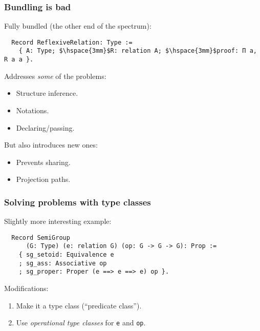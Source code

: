 \documentclass{beamer}
\begin{document}
\begin{frame}[fragile]
\frametitle{Bundling is bad}

Fully bundled (the other end of the spectrum):
\begin{lstlisting}
  Record ReflexiveRelation: Type :=
    { A: Type; $\hspace{3mm}$R: relation A; $\hspace{3mm}$proof: Π a, R a a }.
\end{lstlisting}
Addresses \emph{some} of the problems:
\begin{itemize}
\item Structure inference. %
\item Notations. %
\item Declaring/passing.
\end{itemize}

But also introduces new ones:
\begin{itemize}
\item Prevents sharing.
\item Projection paths.
\end{itemize}
\end{frame}

\begin{frame}[fragile]
\frametitle{Solving problems with type classes}

Slightly more interesting example:
\begin{lstlisting}
  Record SemiGroup
      (G: Type) (e: relation G) (op: G -> G -> G): Prop :=
    { sg_setoid: Equivalence e
    ; sg_ass: Associative op
    ; sg_proper: Proper (e ==> e ==> e) op }.
\end{lstlisting}

Modifications:
\begin{enumerate}
\item Make it a type class (``predicate class'').
\item Use \emph{operational type classes} for \lstinline|e| and \lstinline|op|.
\end{enumerate}

\end{frame}
\end{document}
